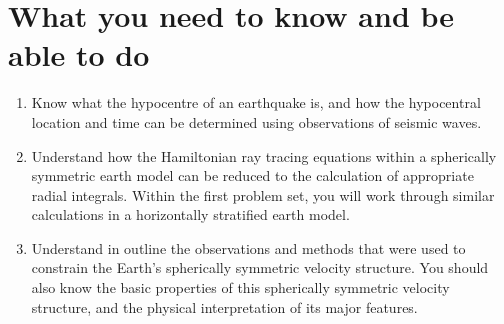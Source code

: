 \section*{What you need to know and be able to do}
\begin{enumerate}
    \item[(i)] Know what the hypocentre of an earthquake is, and how the hypocentral location and time can be determined using observations of seismic waves.
    \item[(ii)] Understand how the Hamiltonian ray tracing equations within a spherically symmetric earth model can be reduced to the calculation of 
    appropriate radial integrals. Within the first problem set, you will work through similar calculations in a horizontally stratified earth model.
    \item[(iii)] Understand in outline the observations and methods that were used to constrain the Earth's spherically symmetric velocity structure. 
    You should also know the basic properties of this spherically symmetric velocity structure, and the physical interpretation of its major features.
\end{enumerate}
